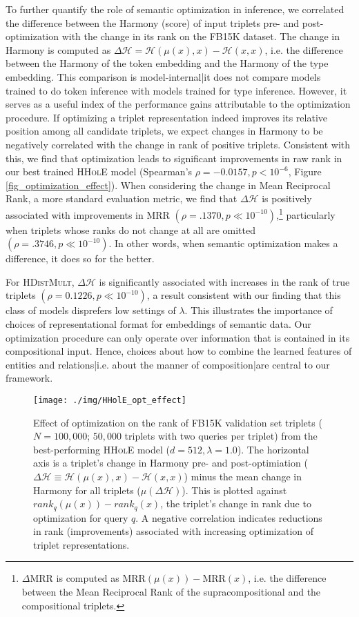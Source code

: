 \documentclass[a4paper,10pt]{article}
\begin{document}
To further quantify the role of semantic optimization in inference, we correlated the difference between the Harmony (score) of input triplets pre- and post-optimization with the change in its rank on the FB15K dataset. The change in Harmony is computed as $\Delta \mathcal{H} = \mathcal{H}(\mu(x),x) - \mathcal{H}(x,x)$, i.e. the difference between the Harmony of the token embedding and the Harmony of the type embedding. This comparison is model-internal|it does not compare models trained to do token inference with models trained for type inference. However, it serves as a useful index of the performance gains attributable to the optimization procedure. If optimizing a triplet representation indeed improves its relative position among all candidate triplets, we expect changes in Harmony to be negatively correlated with the change in rank of positive triplets. Consistent with this, we find that optimization leads to significant improvements in raw rank in our best trained \textsc{HHolE} model (Spearman's $\rho = -0.0157, p<10^{-6}$, Figure \ref{fig_optimization_effect}). When considering the change in Mean Reciprocal Rank, a more standard evaluation metric, we find that $\Delta\mathcal{H}$ is positively associated with improvements in MRR $\left(\rho = .1370, p\ll 10^{-10}\right)$,\footnote{$\Delta$MRR is computed as $\text{MRR}(\mu(x)) -\text{MRR}(x)$, i.e. the difference between the Mean Reciprocal Rank of the supracompositional and the compositional triplets.} particularly when triplets whose ranks do not change at all are omitted $\left(\rho = .3746, p\ll 10^{-10}\right)$. In other words, when semantic optimization makes a difference, it does so for the better. 

For \textsc{HDistMult}, $\Delta\mathcal{H}$ is significantly associated with increases in the rank of true triplets $\left( \rho = 0.1226, p\ll 10^{-10}\right)$, a result consistent with our finding that this class of models disprefers low settings of $\lambda$. This illustrates the importance of choices of representational format for embeddings of semantic data. Our optimization procedure can only operate over information that is contained in its compositional input. Hence, choices about how to combine the learned features of entities and relations|i.e. about the manner of composition|are central to our framework.
\begin{figure}
\texttt{[image: ./img/HHolE\_opt\_effect]}
\caption{Effect of optimization on the rank of FB15K validation set triplets ($N=100,000$; $50,000$ triplets with two queries per triplet) from the best-performing \textsc{HHolE} model ($d=512,\lambda=1.0$). The horizontal axis is a triplet's change in Harmony pre- and post-optimiation ($\Delta\mathcal{H} \equiv\mathcal{H}(\mu(x),x) - \mathcal{H}(x,x)$) minus the mean change in Harmony for all triplets ($\mu(\Delta\mathcal{H})$). This is plotted against $rank_q(\mu(x)) - rank_q(x)$, the triplet's change in rank due to optimization for query $q$. A negative correlation indicates reductions in rank (improvements) associated with increasing optimization of triplet representations.
}
\end{figure}\label{fig_optimization_effect}
\end{document}
